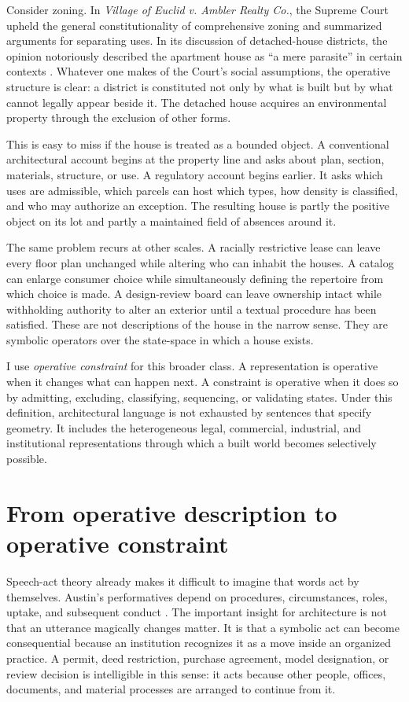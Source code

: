 \documentclass[11pt]{article}
\begin{document}
Consider zoning. In \emph{Village of Euclid v. Ambler Realty Co.}, the Supreme Court upheld the general constitutionality of comprehensive zoning and summarized arguments for separating uses. In its discussion of detached-house districts, the opinion notoriously described the apartment house as ``a mere parasite'' in certain contexts \citep{euclid1926}. Whatever one makes of the Court's social assumptions, the operative structure is clear: a district is constituted not only by what is built but by what cannot legally appear beside it. The detached house acquires an environmental property through the exclusion of other forms.

This is easy to miss if the house is treated as a bounded object. A conventional architectural account begins at the property line and asks about plan, section, materials, structure, or use. A regulatory account begins earlier. It asks which uses are admissible, which parcels can host which types, how density is classified, and who may authorize an exception. The resulting house is partly the positive object on its lot and partly a maintained field of absences around it.

The same problem recurs at other scales. A racially restrictive lease can leave every floor plan unchanged while altering who can inhabit the houses. A catalog can enlarge consumer choice while simultaneously defining the repertoire from which choice is made. A design-review board can leave ownership intact while withholding authority to alter an exterior until a textual procedure has been satisfied. These are not descriptions of the house in the narrow sense. They are symbolic operators over the state-space in which a house exists.

I use \emph{operative constraint} for this broader class. A representation is operative when it changes what can happen next. A constraint is operative when it does so by admitting, excluding, classifying, sequencing, or validating states. Under this definition, architectural language is not exhausted by sentences that specify geometry. It includes the heterogeneous legal, commercial, industrial, and institutional representations through which a built world becomes selectively possible.

\section{From operative description to operative constraint}
Speech-act theory already makes it difficult to imagine that words act by themselves. Austin's performatives depend on procedures, circumstances, roles, uptake, and subsequent conduct \citep{austin1962things}. The important insight for architecture is not that an utterance magically changes matter. It is that a symbolic act can become consequential because an institution recognizes it as a move inside an organized practice. A permit, deed restriction, purchase agreement, model designation, or review decision is intelligible in this sense: it acts because other people, offices, documents, and material processes are arranged to continue from it.
\end{document}
